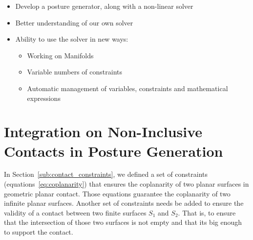 \begin{itemize}
\begin{itemize}
\begin{itemize}
          \item Develop a posture generator, along with a non-linear solver
          \item Better understanding of our own solver
          \item Ability to use the solver in new ways:
          \begin{itemize}
            \item Working on Manifolds
            \item Variable numbers of constraints
            \item Automatic management of variables, constraints and mathematical expressions
          \end{itemize}
        \end{itemize}
    \end{itemize}
\end{itemize}



\section{Integration on Non-Inclusive Contacts in Posture Generation}


In Section~\ref{sub:contact_constraints}, we defined a set of constraints (equations~\ref{eq:coplanarity}) that ensures the coplanarity of two planar surfaces in geometric planar contact.
Those equations guarantee the coplanarity of two infinite planar surfaces.
Another set of constraints needs be added to ensure the validity of a contact between two finite surfaces $S_1$ and $S_2$.
That is, to ensure that the intersection of those two surfaces is not empty and that its big enough to support the contact.

